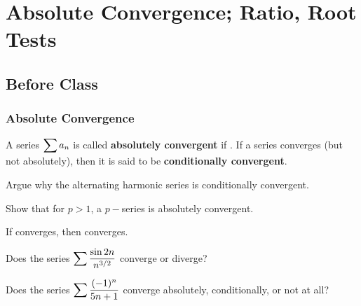 \documentclass[notes]{subfiles}
\begin{document}
	\fancyhead[LO,RE]{\bfseries \small \currentname}
	\fancyfoot[C]{{}}
	\fancyfoot[RO,LE]{\large \thepage}	%
	
\section*{Absolute Convergence; Ratio, Root Tests}\label{cs116}
	\subsection*{Before Class}
	\subsubsection*{Absolute Convergence}
		\begin{defn}
			A series $\displaystyle \sum a_n$ is called \textbf{absolutely convergent} if .  If a series converges (but not absolutely), then it is said to be \textbf{conditionally convergent}.
		\end{defn}
		
		\begin{ex}
			Argue why the alternating harmonic series is conditionally convergent.
		\end{ex}
			
		\begin{ex}
			Show that for $p >1$, a $p-$series is absolutely convergent.
		\end{ex}	
			
		\begin{thm}
			If  converges, then  converges.
		\end{thm}	
			\newpage
		
		\begin{ex}
			Does the series $\displaystyle \sum \dfrac{\sin 2n}{n^{3/2}}$ converge or diverge?
		\end{ex}
			
		\begin{ex}
			Does the series $\displaystyle \sum \dfrac{(-1)^n}{5n+1}$ converge absolutely, conditionally, or not at all?
		\end{ex}
					
\end{document}
